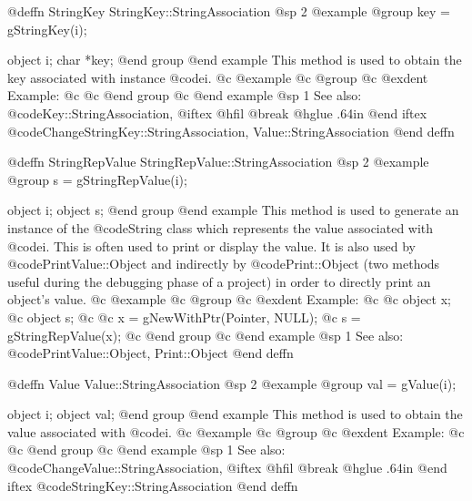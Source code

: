 @deffn {StringKey} StringKey::StringAssociation
@sp 2
@example
@group
key = gStringKey(i);

object  i;
char    *key;
@end group
@end example
This method is used to obtain the key associated with instance @code{i}.
@c @example
@c @group
@c @exdent Example:
@c 
@c @end group
@c @end example
@sp 1
See also:  @code{Key::StringAssociation,}
@iftex
@hfil @break @hglue .64in      
@end iftex
@code{ChangeStringKey::StringAssociation, Value::StringAssociation}
@end deffn






@deffn {StringRepValue} StringRepValue::StringAssociation
@sp 2
@example
@group
s = gStringRepValue(i);

object  i;
object  s;
@end group
@end example
This method is used to generate an instance of the @code{String} class
which represents the value associated with @code{i}.  This is often
used to print or display the value.  It is also used by
@code{PrintValue::Object} and indirectly by @code{Print::Object}
(two methods useful during the debugging phase of a project)
in order to directly print an object's value.
@c @example
@c @group
@c @exdent Example:
@c 
@c object  x;
@c object  s;
@c 
@c x = gNewWithPtr(Pointer, NULL);
@c s = gStringRepValue(x);
@c @end group
@c @end example
@sp 1
See also:  @code{PrintValue::Object, Print::Object}
@end deffn






@deffn {Value} Value::StringAssociation
@sp 2
@example
@group
val = gValue(i);

object  i;
object  val;
@end group
@end example
This method is used to obtain the value associated with
@code{i}.
@c @example
@c @group
@c @exdent Example:
@c 
@c @end group
@c @end example
@sp 1
See also:  @code{ChangeValue::StringAssociation,}
@iftex
@hfil @break @hglue .64in      
@end iftex
@code{StringKey::StringAssociation}
@end deffn





